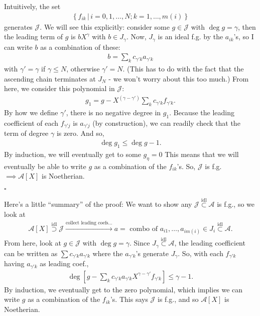 \documentclass[12pt]{article}
\newcommand{\lb}{\left[}
\newcommand{\rb}{\right]}
\newcommand{\lc}{\left\{}
\newcommand{\rc}{\right\}}
\begin{document}
	\noindent Intuitively, the set 
	\begin{align*}
	\lc f_{ik} \,\vert\, i = 0,1,\dots,N; k = 1,\dots,m(i) \rc
	\end{align*} 
	generates $\mathcal{J}$. We will see this explicitly: consider some ${g} \in \mathcal{J}$ with $\deg {g} = \gamma$, then the leading term of ${g}$ is $bX^\gamma$ with $b\in J_\gamma$. Now, $J_\gamma$ is an ideal f.g. by the $a_{ik}$'s, so I can write $b$ as a combination of these:
	\begin{align*}
	b = \sum_{k}c_{\gamma'k}a_{\gamma'k}
	\end{align*}
	with $\gamma' = \gamma$ if $\gamma \leq N$, otherwise $\gamma' = N$. (This has to do with the fact that the ascending chain terminates at $J_N$ - we won't worry about this too much.) From here, we consider this polynomial in $\mathcal{J}$:
	\begin{align*}
	g_1 = g - X^{(\gamma-\gamma')}\sum_k c_{\gamma'k}f_{\gamma'k}.
	\end{align*}    
	By how we define $\gamma'$, there is no negative degree in $g_1$. Because the leading coefficient of each $f_{\gamma'j}$ is $a_{\gamma'j}$ (by construction), we can readily check that the term of degree $\gamma$ is zero. And so,
	\begin{align*}
	\deg g_1 \leq \deg g - 1.
	\end{align*}
	By induction, we will eventually get to some $g_\eta = 0$ This means that we will eventually be able to write $g$ as a combination of the $f_{ik}$'s. So, $\mathcal{J}$ is f.g. $\implies \mathcal{A}[X]$ is Noetherian.
 


\hfill$\square$

\noindent \hrulefill

Here's a little ``summary'' of the proof: We want to show any $\mathcal{J} \overset{\text{idl}}{\subset} \mathcal{A}$ is f.g., so we look at
\begin{align*}
\mathcal{A}[X] \overset{\text{idl}}{\supset}\mathcal{J} \xrightarrow{\text{collect leading coefs...}} a = \text{ combo of }a_{i1},\dots,a_{im(i)} \in J_i \overset{\text{idl}}{\subset} \mathcal{A}.
\end{align*}
From here, look at $g\in \mathcal{J}$ with $\deg g = \gamma$. Since ${J}_\gamma \overset{\text{idl}}{\subset} \mathcal{A}$, the leading coefficient can be written as $\sum c_{\gamma'k}a_{\gamma'k}$ where the $a_{\gamma'k}$'s generate $J_\gamma$. So, with each $f_{\gamma'k}$ having $a_{\gamma'k}$ as leading coef.,
\begin{align*}
\deg\lb g - \sum_{k}c_{\gamma'k}a_{\gamma'k} X^{\gamma-\gamma'}f_{\gamma'k}\rb \leq \gamma-1.
\end{align*}
By induction, we eventually get to the zero polynomial, which implies we can write $g$ as a combination of the $f_{ik}$'s. This says $\mathcal{J}$ is f.g., and so $\mathcal{A}[X]$ is Noetherian.
\end{document}
